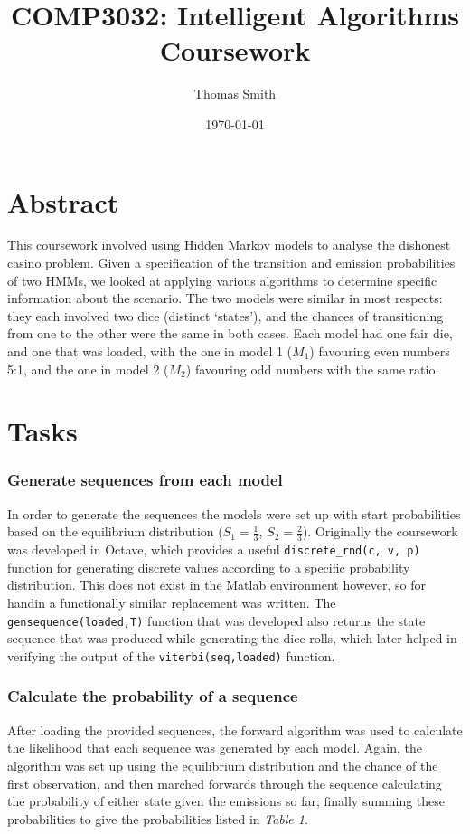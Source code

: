 \documentclass[10pt]{article}
\begin{document}
\title      {COMP3032: Intelligent Algorithms Coursework}
\author	    {Thomas Smith}
\date       {\today}
\maketitle
\begin{multicols}{2}
\section{Abstract}
This coursework involved using Hidden Markov models to analyse the dishonest casino problem. Given a specification of the transition and emission probabilities of two HMMs, we looked at applying various algorithms to determine specific information about the scenario. The two models were similar in most respects: they each involved two dice (distinct `states'), and the chances of transitioning from one to the other were the same in both cases. Each model had one fair die, and one that was loaded, with the one in model 1 ($M_1$) favouring even numbers 5:1, and the one in model 2 ($M_2$) favouring odd numbers with the same ratio. 
\section{Tasks}
\subsubsection*{Generate sequences from each model}
In order to generate the sequences the models were set up with start probabilities based on the equilibrium distribution ($S_1 = \frac{1}{3}$, $S_2 = \frac{2}{3}$). Originally the coursework was developed in Octave, which provides a useful \texttt{discrete\_rnd(c, v, p)} function for generating discrete values according to a specific probability distribution. This does not exist in the Matlab environment however, so for handin a functionally similar replacement was written. The \texttt{gensequence(loaded,T)} function that was developed also returns the state sequence that was produced while generating the dice rolls, which later helped in verifying the output of the \texttt{viterbi(seq,loaded)} function.
\subsubsection*{Calculate the probability of a sequence}
After loading the provided sequences, the forward algorithm was used to calculate the likelihood that each sequence was generated by each model. Again, the algorithm was set up using the equilibrium distribution and the chance of the first observation, and then marched forwards through the sequence calculating the probability of either state given the emissions so far; finally summing these probabilities to give  the probabilities listed in \emph{Table 1}.


\end{multicols}
\end{document}
